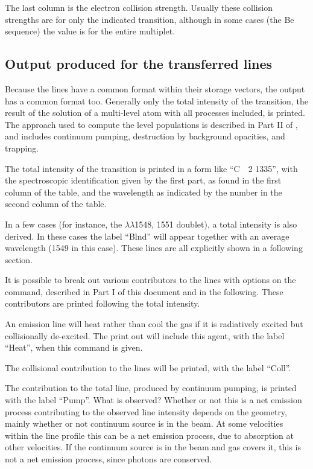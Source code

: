 The last column is the electron collision strength.
Usually these collision strengths
are for only the indicated transition, although in some cases (the Be
sequence) the value is for the entire multiplet.

\subsection{Output produced for the transferred lines}

Because the lines have a common format within their storage vectors,
the output has a common format too.
Generally only the total intensity
of the transition, the result of the solution of a multi-level atom with
all processes included, is printed.
The approach used to compute the level
populations is described in Part II of \Hazy,
and includes continuum pumping,
destruction by background opacities, and trapping.

The total intensity of the transition is printed in a form like ``C~~2 1335'', with the spectroscopic identification given by the first part,
as found in the first column of the table, and the wavelength as indicated
by the number in the second column of the table.

In a few cases (for instance, the  $\lambda\lambda$1548, 1551 doublet), a total
intensity is also derived.
In these cases the label ``Blnd'' will appear
together with an average wavelength (1549 in this case).
These lines are
all explicitly shown in a following section.

It is possible to break out various contributors to the lines with options
on the  command, described in Part I of this document and in the
following.
These contributors are printed following the total intensity.

  An emission line will heat
rather than cool the gas
if it is radiatively excited but collisionally de-excited.
The print out
will include this agent, with the label ``Heat'',
when this command is given.

  The collisional contribution
to the lines will
be printed, with the label ``Coll''.

  The contribution to the total line, produced by continuum
pumping, is printed with the label ``Pump''.   What is observed?  Whether
or not this is a net emission process contributing to the observed line
intensity depends on the geometry, mainly whether or not continuum source
is in the beam. At some velocities within the line profile this can be a
net emission process, due to absorption at other velocities.   If the
continuum source is in the beam and gas covers it, this is not a net emission
process, since photons are conserved.

